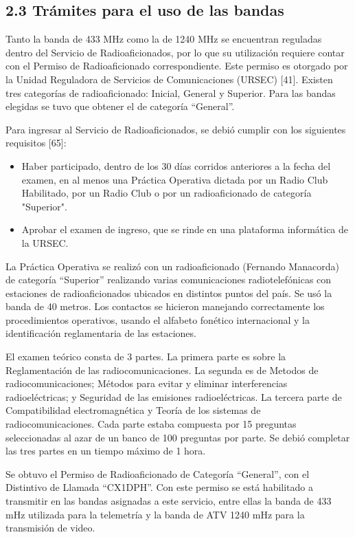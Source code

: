 \documentclass[12pt,a4paper]{article}
\begin{document}
\subsection{2.3 Trámites para el uso de las bandas}\label{truxe1mites-para-el-uso-de-las-bandas}

Tanto la banda de 433 MHz como la de 1240 MHz se encuentran reguladas dentro del Servicio de Radioaficionados, por lo que su utilización requiere contar con el Permiso de Radioaficionado correspondiente. Este permiso es otorgado por la Unidad Reguladora de Servicios de Comunicaciones (URSEC) {[}41{]}. Existen tres categorías de radioaficionado: Inicial, General y Superior. Para las bandas elegidas se tuvo que obtener el de categoría ``General''.

Para ingresar al Servicio de Radioaficionados, se debió cumplir con los siguientes requisitos {[}65{]}:

\begin{itemize}
\item
  Haber participado, dentro de los 30 días corridos anteriores a la fecha del examen, en al menos una Práctica Operativa dictada por un Radio Club Habilitado, por un Radio Club o por un radioaficionado de categoría "Superior".
\item
  Aprobar el examen de ingreso, que se rinde en una plataforma informática de la URSEC.
\end{itemize}

La Práctica Operativa se realizó con un radioaficionado (Fernando Manacorda) de categoría ``Superior'' realizando varias comunicaciones radiotelefónicas con estaciones de radioaficionados ubicados en distintos puntos del país. Se usó la banda de 40 metros. Los contactos se hicieron manejando correctamente los procedimientos operativos, usando el alfabeto fonético internacional y la identificación reglamentaria de las estaciones.

El examen teórico consta de 3 partes. La primera parte es sobre la Reglamentación de las radiocomunicaciones. La segunda es de Metodos de radiocomunicaciones; Métodos para evitar y eliminar interferencias radioeléctricas; y Seguridad de las emisiones radioeléctricas. La tercera parte de Compatibilidad electromagnética y Teoría de los sistemas de radiocomunicaciones. Cada parte estaba compuesta por 15 preguntas seleccionadas al azar de un banco de 100 preguntas por parte. Se debió completar las tres partes en un tiempo máximo de 1 hora.

Se obtuvo el Permiso de Radioaficionado de Categoría ``General'', con el Distintivo de Llamada ``CX1DPH''. Con este permiso se está habilitado a transmitir en las bandas asignadas a este servicio, entre ellas la banda de 433 mHz utilizada para la telemetría y la banda de ATV 1240 mHz para la transmisión de video.
\end{document}
